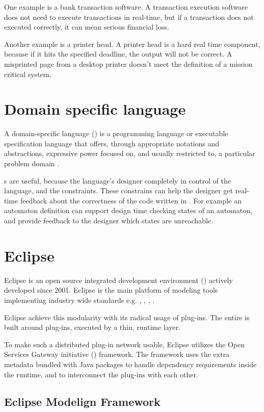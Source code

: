 One example is a bank transaction software. A transaction execution software does not need to execute transactions in real-time, but if a transaction does not executed correctly, it can mean serious financial loss.

Another example is a printer head. A printer head is a hard real time component, because if it hits the specified deadline, the output will not be correct. A misprinted page from a desktop printer doesn't meet the definition of a mission critical system.

\section{Domain specific language}

A domain-specific language (\dsl{}) is a programming language or executable specification language that offers, through appropriate notations and abstractions, expressive power focused on, and usually restricted to, a particular problem domain \citep{van2000domain}.

\dsl{}s are useful, because the language's designer completely in control of the language, and the constraints. These constrains can help the designer get real-time feedback about the correctness of the code written in \dsl. For example an automaton definition \dsl{} can support design time checking states of an automaton, and provide feedback to the designer which states are unreachable.

\section{Eclipse}

Eclipse is an open source integrated development environment () actively developed since 2001. Eclipse is the main platform of modeling tools implementing industry wide standards e.g. \emf, , , .

Eclipse achieve this modularity with its radical usage of plug-ins. The entire  is built around plug-ins, executed by a thin, runtime layer.

To make such a distributed plug-in network usable, Eclipse utilizes the Open Services Gateway initiative () framework. The  framework uses the extra metadata bundled with Java packages to handle dependency requirements inside the runtime, and to interconnect the plug-ins with each other.

\subsection{Eclipse Modelign Framework}

